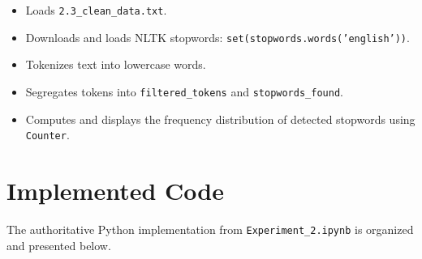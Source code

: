 \documentclass[12pt,a4paper]{report}
\begin{document}
\begin{enumerate}
    \begin{itemize}
        \item Loads \texttt{2.3\_clean\_data.txt}.
        \item Downloads and loads NLTK stopwords: \texttt{set(stopwords.words('english'))}.
        \item Tokenizes text into lowercase words.
        \item Segregates tokens into \texttt{filtered\_tokens} and \texttt{stopwords\_found}.
        \item Computes and displays the frequency distribution of detected stopwords using \texttt{Counter}.
    \end{itemize}
\end{enumerate}

\section{Implemented Code}
The authoritative Python implementation from \texttt{Experiment\_2.ipynb} is organized and presented below.
\end{document}
